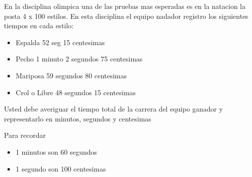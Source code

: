 En la disciplina olimpica una de las pruebas mas esperadas es en la natacion la posta 4 x 100 estilos. En esta disciplina el equipo nadador registro los siguientes tiempos en cada estilo:

\begin{itemize}
	\item Espalda 52 seg 15 centesimas
	\item Pecho 1 minuto 2 segundos 75 centesimas
	\item Mariposa 59 segundos 80 centesimas
	\item Crol o Libre 48 segundos 15 centesimas
\end{itemize}

Usted debe averiguar el tiempo total de la carrera del equipo ganador y representarlo en minutos, segundos y centesimas

Para recordar

\begin{itemize}
\item 1 minutos son 60 segundos
\item 1 segundo son 100 centesimas
\end{itemize}